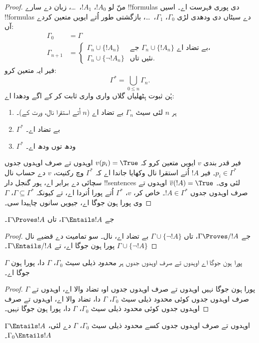 \documentclass[../../../include/open-logic-section]{subfiles}
\begin{document}
\begin{proof}
منّ لو $!A_0$، $!A_1$،~\dots، زبان دے سارے !!{formula}s دی پوری فہرست اے۔ اسیں !!{formula}s دے سیٹاں دی ودھدی لڑی $\Gamma_0$، $\Gamma_1$،~\dots، بازگشتی طور اُتے ایویں متعین کردے آں:
\begin{align*}
\Gamma_0 & = \Gamma\\
\Gamma_{n+1} &  =
\begin{cases}
  \Gamma_n \cup \{!A_n\} & \text{جے $\Gamma_n \cup \{!A_n\}$ بے تضاد اے،}\\
  \Gamma_n \cup \{\lnot !A_n\} & \text{نئیں تاں}.
\end{cases}
\end{align*}
فیر ایہ متعین کرو:
\[
\Gamma^* = \bigcup_{0\le n}\Gamma_n.
\]
ہُن ثبوت ہِٹھلیاں گلاں واری واری ثابت کر کے اگے ودھدا اے:
\begin{enumerate}
\item ہر $n$ لئی سیٹ $\Gamma_n$ بے تضاد اے ($n$ اُتے استقرا نال،  ورت کے)۔
\item $\Gamma^*$ بے تضاد اے۔
\item $\Gamma^*$ ودھ توں ودھ اے۔
\end{enumerate}
فیر قدر بندی $v$ ایویں متعین کرو کہ $v(p_i) = \True$ اوہدوں تے صرف اوہدوں جدوں $p_i \in \Gamma^*$۔ فیر $!A$ اُتے استقرا نال وکھایا جاندا اے کہ $\Gamma^*$ وچ رکنیت، $v$ دے حساب نال سچائی دے برابر اے، ہور گنجل دار !!{sentence}s لئی وی۔ $ \overline{v}(!A) = \True$ اوہدوں تے صرف اوہدوں جدوں $!A \in \Gamma^*$۔ خاص کر، $v$، $\Gamma^*$ اُتے پورا اُتردا اے، تے کیونکہ $\Gamma \subseteq \Gamma^*$، $\Gamma$ وی پورا ہون جوگا اے، جیویں سانوں چاہیدا سی۔
\end{proof}

\begin{cor}
جے $\Gamma \Entails !A$، تاں $\Gamma \Proves !A$۔
\end{cor}

\begin{proof}
جے $\Gamma\Proves/ !A$، تاں $\Gamma \cup \{\lnot !A\}$ بے تضاد اے،  نال۔ سو تمامیت دے قضیے نال $\Gamma \cup
\{\lnot !A\}$ پورا ہون جوگا اے، تے $\Gamma \Entails/ !A$۔
\end{proof}

\begin{prop}
$\Gamma$ پورا ہون جوگا اے اوہدوں تے صرف اوہدوں جدوں ہر \emph{محدود} ذیلی سیٹ $\Gamma_0$، $ \Gamma$ دا، پورا ہون جوگا اے۔
\end{prop}

\begin{proof}
$\Gamma$ پورا ہون جوگا نہیں اوہدوں تے صرف اوہدوں جدوں اوہ تضاد والا اے، اوہدوں تے صرف اوہدوں جدوں کوئی محدود ذیلی سیٹ $\Gamma_0$، $ \Gamma$ دا، تضاد والا اے، اوہدوں تے صرف اوہدوں جدوں کوئی محدود ذیلی سیٹ $\Gamma_0$، $ \Gamma$ دا، پورا ہون جوگا نہیں۔
\end{proof}

\begin{cor}
$\Gamma \Entails !A$ اوہدوں تے صرف اوہدوں جدوں کسے محدود ذیلی سیٹ $\Gamma_0$، $ \Gamma$ دے لئی، $\Gamma_0 \Entails !A$۔
\end{cor}
\end{document}
